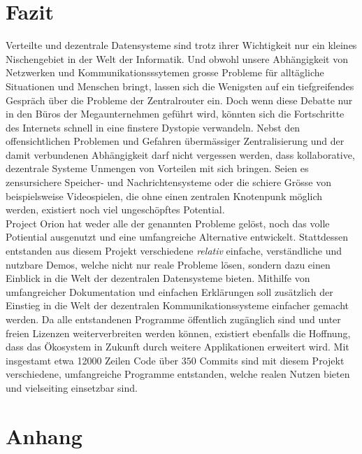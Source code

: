 \documentclass[a4paper,11pt,titlepage,twoside]{memoir}
\begin{document}
\chapter{Fazit}
\label{sec:org61a7310}
Verteilte und dezentrale Datensysteme sind trotz ihrer Wichtigkeit nur
ein kleines Nischengebiet in der Welt der Informatik. Und obwohl
unsere Abhängigkeit von Netzwerken und Kommunikationsssytemen grosse
Probleme für alltägliche Situationen und Menschen bringt, lassen sich
die Wenigsten auf ein tiefgreifendes Gespräch über die Probleme der
Zentralrouter ein. Doch wenn diese Debatte nur in den Büros der
Megaunternehmen geführt wird, könnten sich die Fortschritte des
Internets schnell in eine finstere Dystopie verwandeln. Nebst den
offensichtlichen Problemen und Gefahren übermässiger Zentralisierung
und der damit verbundenen Abhängigkeit darf nicht vergessen werden,
dass kollaborative, dezentrale Systeme Unmengen von Vorteilen mit sich
bringen. Seien es zensursichere Speicher- und Nachrichtensysteme oder
die schiere Grösse von beispielsweise Videospielen, die ohne einen
zentralen Knotenpunk möglich werden, existiert noch viel ungeschöpftes
Potential.\\

\noindent Project Orion hat weder alle der genannten Probleme gelöst,
noch das volle Potiential ausgenutzt und eine umfangreiche Alternative
entwickelt. Stattdessen entstanden aus diesem Projekt verschiedene
\emph{relativ} einfache, verständliche und nutzbare Demos, welche nicht nur
reale Probleme lösen, sondern dazu einen Einblick in die Welt der
dezentralen Datensysteme bieten. Mithilfe von umfangreicher
Dokumentation und einfachen Erklärungen soll zusätzlich der Einstieg
in die Welt der dezentralen Kommunikationssysteme einfacher gemacht
werden. Da alle entstandenen Programme öffentlich zugänglich sind und
unter freien Lizenzen weiterverbreiten werden können, existiert
ebenfalls die Hoffnung, dass das Ökosystem in Zukunft durch weitere
Applikationen erweitert wird. Mit insgestamt etwa 12000 Zeilen
Code über \(350\) Commits sind mit diesem Projekt verschiedene,
umfangreiche Programme entstanden, welche realen Nutzen bieten und
vielseiting einsetzbar sind.

\chapter{Anhang}
\label{sec:org434a3bf}
\end{document}
